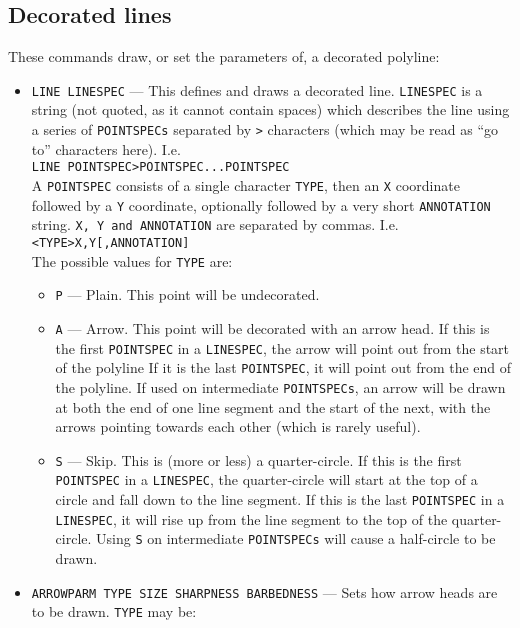 \documentclass[a4paper,twoside,11pt]{article}
\newcommand{\textttc}[1]{\texttt{\textcolor{OurRed}{#1}}}
\begin{document}
\subsection{Decorated lines}
These commands draw, or set the parameters of, a decorated polyline:
\begin{itemize}
\item \textttc{LINE LINESPEC} --- This defines and draws a decorated line. \texttt{LINESPEC} is a string
  (not quoted, as it cannot contain spaces) which describes the line using a series of \texttt{POINTSPECs}
  separated by \texttt{>} characters (which may be read as ``go to'' characters here). I.e.\\
  \texttt{LINE POINTSPEC>POINTSPEC...POINTSPEC}\\
  A \texttt{POINTSPEC} consists of a single character \texttt{TYPE}, then an \texttt{X} coordinate followed by a \texttt{Y}
  coordinate, optionally followed by a very short \texttt{ANNOTATION} string. \texttt{X, Y and ANNOTATION} are separated
  by commas. I.e.\\
  \texttt{<TYPE>X,Y[,ANNOTATION]}\\
  The possible values for \texttt{TYPE} are:
  \begin{itemize}
  \item \texttt{P} --- Plain. This point will be undecorated.
  \item \texttt{A} --- Arrow. This point will be decorated with an arrow head. If this is the first
    \texttt{POINTSPEC} in a \texttt{LINESPEC}, the arrow will point out from the start of the polyline
    If it is the last \texttt{POINTSPEC}, it will point out from the end of the polyline.
    If used on intermediate \texttt{POINTSPECs}, an arrow will be drawn at both the end of one line segment and the start of
    the next, with the arrows pointing towards each other (which is rarely useful).
  \item \texttt{S} --- Skip. This is (more or less) a quarter-circle. If this is the first
    \texttt{POINTSPEC} in a \texttt{LINESPEC}, the quarter-circle will start at the top of a circle and fall down to
    the line segment. If this is the last \texttt{POINTSPEC} in a \texttt{LINESPEC}, it will rise up from the line segment
    to the top of the quarter-circle. Using \texttt{S} on intermediate \texttt{POINTSPECs} will cause a half-circle to be drawn.
  \end{itemize}
\item \textttc{ARROWPARM TYPE SIZE SHARPNESS BARBEDNESS} --- Sets how arrow heads are to be drawn. \texttt{TYPE} may be:

\end{itemize}
\end{document}
